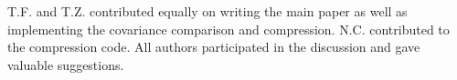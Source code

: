 \documentclass[twocolumn]{\docclass}
\begin{document}
	
	 
	
	T.F. and T.Z. contributed equally on writing the main paper as well as implementing the covariance comparison and compression. N.C. contributed to the compression code. All authors participated in the discussion and gave valuable suggestions.
	
	
	
	
	
	
	
	
	
	
	
	
	
\end{document}
